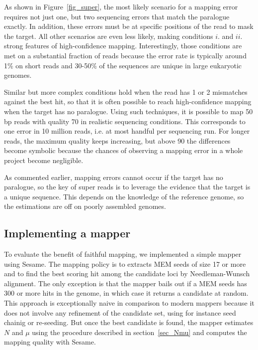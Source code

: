 \documentclass[a4,center,fleqn]{NAR}
\begin{document}
As shown in Figure~\ref{fig_super}, the most likely scenario for a
mapping error requires not just one, but two sequencing errors that match
the paralogue exactly. In addition, these errors must be at specific
positions of the read to mask the target. All other scenarios are even
less likely, making conditions $i.$ and $ii.$ strong features of
high-confidence mapping. Interestingly, those conditions are met on a
substantial fraction of reads because the error rate is typically around
1\% on short reads and 30-50\% of the sequences are unique in large
eukaryotic genomes.

Similar but more complex conditions hold when the read has 1 or 2
mismatches against the best hit, so that it is often possible to reach
high-confidence mapping when the target has no paralogue. Using such
techniques, it is possible to map 50 bp reads with quality 70 in realistic
sequencing conditions. This corresponds to one error in 10 million reads,
i.e. at most handful per sequencing run. For longer reads, the maximum
quality keeps increasing, but above 90 the differences become symbolic
because the chances of observing a mapping error in a whole project become
negligible.

As commented earlier, mapping errors cannot occur if the target has no
paralogue, so the key of super reads is to leverage the evidence that the
target is a unique sequence. This depends on the knowledge of the
reference genome, so the estimations are off on poorly assembled genomes.


\subsection{Implementing a mapper}

To evaluate the benefit of faithful mapping, we implemented a simple
mapper using Sesame. The mapping policy is to extracts MEM seeds of size
17 or more and to find the best scoring hit among the candidate loci by
Needleman-Wunsch alignment\cite{1}. The only exception is that the mapper
bails out if a MEM seeds has 300 or more hits in the genome, in which case
it returns a candidate at random. This approach is exceptionally naive in
comparison to modern mappers because it does not involve any refinement of
the candidate set, using for instance seed chainig or re-seeding. But once
the best candidate is found, the mapper estimates $N$ and $\mu$ using the
procedure described in section~\ref{sec_Nmu} and computes the mapping
quality with Sesame.
\end{document}
